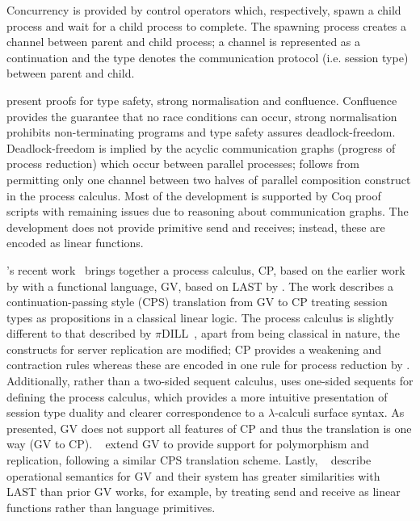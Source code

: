 \documentclass{mprop}
\begin{document}
Concurrency is provided by control operators which, respectively, spawn a
child process and wait for a child process to complete. The spawning process
creates a channel between parent and child process; a channel is represented
as a continuation and the type denotes the communication protocol
(i.e. session type) between parent and child.

\citeauthor{Mazurak:2010:LCC} present proofs for type safety, strong
normalisation and confluence. Confluence provides the guarantee that no race
conditions can occur, strong normalisation prohibits non-terminating programs
and type safety assures deadlock-freedom. Deadlock-freedom is implied by the
acyclic communication graphs (progress of process reduction) which occur
between parallel processes; follows from permitting only one channel between
two halves of parallel composition construct in the process calculus. Most of
the development is supported by Coq proof scripts with remaining issues due to
reasoning about communication graphs. The development does not provide
primitive send and receives; instead, these are encoded as linear functions.

\citeauthor{Wadler:2014}'s recent work~\cite{Wadler:2014} brings together a
process calculus, CP, based on the earlier work by
\citeauthor{Caires:2010:STI} with a functional language, GV, based on LAST by
\citeauthor{Gay:2010:LAST}. The work describes a continuation-passing style
(CPS) translation from GV to CP treating session types as propositions in a
classical linear logic. The process calculus is slightly different to that
described by $\pi$DILL~\cite{Caires:2010:STI}, apart from being classical in
nature, the constructs for server replication are modified; CP provides a
weakening and contraction rules whereas these are encoded in one rule for
process reduction by \citeauthor{Caires:2010:STI}. Additionally, rather than a
two-sided sequent calculus, \citeauthor{Wadler:2014} uses one-sided sequents
for defining the process calculus, which provides a more intuitive
presentation of session type duality and clearer correspondence to a
$\lambda$-calculi surface syntax. As presented, GV does not support all
features of CP and thus the translation is one way (GV to
CP). \citeauthor{Lindley:2014:SAP}~\cite{Lindley:2014:SAP} extend GV to
provide support for polymorphism and replication, following a similar CPS
translation scheme. Lastly,
\citeauthor{Lindley:2014:SPS}~\cite{Lindley:2014:SPS} describe operational
semantics for GV and their system has greater similarities with LAST than
prior GV works, for example, by treating send and receive as linear functions
rather than language primitives.
\end{document}
